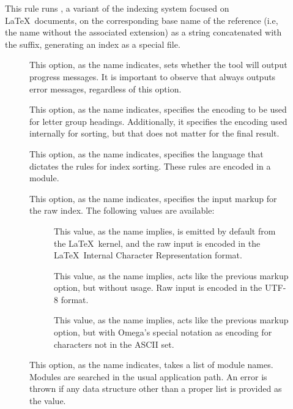 \begin{description}
\item[]
This rule runs , a variant of the  indexing system focused on \LaTeX\ documents, on the corresponding base name of the  reference (i.e, the name without the associated extension) as a string concatenated with the  suffix, generating an index as a special  file.

\begin{description}
\item[] This option, as the name indicates, sets whether the tool will output progress messages. It is important to observe that  always outputs error messages, regardless of this option.

\item[] This option, as the name indicates, specifies the encoding to be used for letter group headings. Additionally, it specifies the encoding used internally for sorting, but that does not matter for the final result.

\item[] This option, as the name indicates, specifies the language that dictates the rules for index sorting. These rules are encoded in a module.

\item[] This option, as the name indicates, specifies the input markup for the raw index. The following values are available:

\begin{description}
\item[] This value, as the name implies, is emitted by default from the \LaTeX\ kernel, and the raw input is encoded in the \LaTeX\ Internal Character Representation format.

\item[] This value, as the name implies, acts like the previous  markup option, but without  usage. Raw input is encoded in the UTF-8 format.

\item[] This value, as the name implies, acts like the previous  markup option, but with Omega's special notation as encoding for characters not in the ASCII set.
\end{description}

\item[] This option, as the name indicates, takes a list of module names. Modules are searched in the usual application path. An error is thrown if any data structure other than a proper list is provided as the value.


\end{description}
\end{description}
